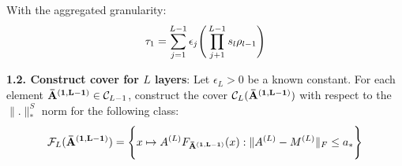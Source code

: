 \noindent With the aggregated granularity:
\begin{align*}
    \tau_1 = \sum_{j=1}^{L-1}\epsilon_j \Bigg( \prod_{j+1}^{L-1} s_l\rho_{l-1} \Bigg)
\end{align*}


\noindent\newline\textbf{1.2. Construct cover for $L$ layers}: Let $\epsilon_L>0$ be a known constant. For each element ${\bf {\bar A}^{(1, L-1)}}\in\mathcal{C}_{L-1}$, construct the cover $\mathcal{C}_L({\bf {\bar A}^{(1, L-1)}})$ with respect to the $\|.\|_*^S$ norm for the following class:
\begin{align*}
    \mathcal{F}_L({\bf {\bar A}^{(1, L-1)}}) = \Bigg\{ 
        x \mapsto A^{(L)}F_{\bf {\bar A}^{(1, L-1)}}(x) : \|A^{(L)}-M^{(L)}\|_F \le a_*
     \Bigg\}
\end{align*} 

